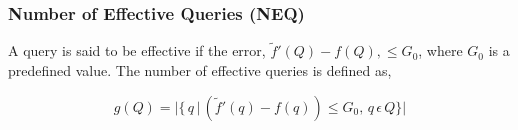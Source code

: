 \subsubsection{Number of Effective Queries (NEQ)}
\label{section:metrics_neq}

A query is said to be effective if the error, $\tilde{f}'(Q) - f(Q), \leq G_0$,  where $G_0$ is a predefined value. The number of effective queries is defined as,

\begin{equation}
    g(Q) =  |\{\,q\, | \, (\tilde{f}'(q) - f(q)) \leq G_0, \,q\, \epsilon \,Q\}|
\end{equation}


